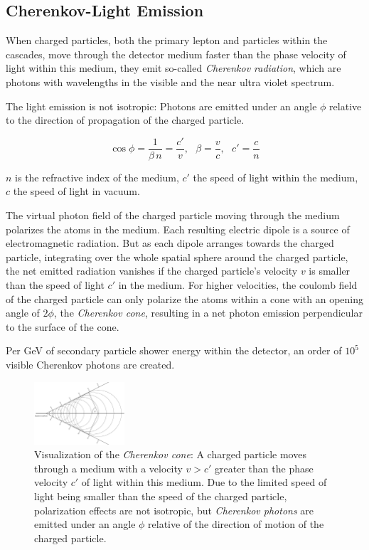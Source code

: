 \subsection{Cherenkov-Light Emission}
\label{sec:cherenkov}

When charged particles, both the primary lepton and particles within the cascades, move through the detector medium faster than the phase velocity of light within this medium, they emit so-called \textit{Cherenkov radiation}, which are photons with wavelengths in the visible and the near ultra violet spectrum. \cite{energyreco, instrumentation, skysearch}

The light emission is not isotropic: Photons are emitted under an angle $\phi$ relative to the direction of propagation of the charged particle. \cite{physiklexikon}

$$
  \cos \phi = \frac{1}{\beta\,n} = \frac{c'}{v}, \ \ \ \beta = \frac{v}{c}, \ \ \ c' = \frac{c}{n}
$$

$n$ is the refractive index of the medium, $c'$ the speed of light within the medium, $c$ the speed of light in vacuum.

The virtual photon field of the charged particle moving through the medium polarizes the atoms in the medium. Each resulting electric dipole is a source of electromagnetic radiation. But as each dipole arranges towards the charged particle, integrating over the whole spatial sphere around the charged particle, the net emitted radiation vanishes if the charged particle's velocity $v$ is smaller than the speed of light $c'$ in the medium. For higher velocities, the coulomb field of the charged particle can only polarize the atoms within a cone with an opening angle of $2\phi$, the \textit{Cherenkov cone}, resulting in a net photon emission perpendicular to the surface of the cone. \cite{physiklexikon}

Per GeV of secondary particle shower energy within the detector, an order of $10^5$ visible Cherenkov photons are created. \cite{instrumentation}

\begin{figure}[htbp]
  \centering\includegraphics[width=0.3\textwidth]{img/cherenkov}
  \caption{Visualization of the \textit{Cherenkov cone}: A charged particle moves through a medium with a velocity $v>c'$ greater than the phase velocity $c'$ of light within this medium. Due to the limited speed of light being smaller than the speed of the charged particle, polarization effects are not isotropic, but \textit{Cherenkov photons} are emitted under an angle $\phi$ relative of the direction of motion of the charged particle.}
  \label{fig:ehai2Ahj}
\end{figure}


